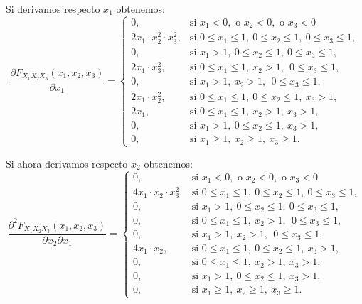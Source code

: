 \documentclass[]{book}
\begin{document}
Si derivamos respecto \(x_1\) obtenemos:
\[
\frac{\partial F_{X_1X_2X_3}(x_1,x_2,x_3)}{\partial x_1}=\begin{cases}
0, & \mbox{si }x_1<0,\mbox{ o }x_2<0,\mbox{ o }x_3 <0\\
2 x_1\cdot x_2^2\cdot x_3^2, & \mbox{si }0\leq x_1\leq 1,\ 0\leq x_2\leq 1,\ 0\leq x_3\leq 1, \\
 0, & \mbox{si }x_1> 1,\ 0\leq x_2\leq  1,\ 0\leq x_3\leq  1, \\
 2 x_1 \cdot x_3^2, & \mbox{si }0\leq x_1\leq  1,\ x_2> 1,\ \ 0\leq x_3\leq  1, \\
 0, & \mbox{si }x_1> 1,\ x_2> 1,\ \ 0\leq x_3\leq  1, \\
 2 x_1\cdot x_2^2, & \mbox{si }0\leq x_1\leq  1,\ 0\leq x_2\leq  1,\ x_3> 1,\\
 2 x_1, & \mbox{si }0\leq x_1\leq  1,\ x_2 >  1,\ x_3> 1,\\
 0, & \mbox{si }x_1>1,\ 0\leq x_2\leq  1,\ x_3> 1,\\
0, & \mbox{si }x_1\geq 1,\ x_2\geq 1,\ x_3\geq 1.
\end{cases}
\]

Si ahora derivamos respecto \(x_2\) obtenemos:
\[
\frac{\partial^2 F_{X_1X_2X_3}(x_1,x_2,x_3)}{\partial x_2\partial x_1}=\begin{cases}
0, & \mbox{si }x_1<0,\mbox{ o }x_2<0,\mbox{ o }x_3 <0\\
4 x_1\cdot x_2\cdot x_3^2, & \mbox{si }0\leq x_1\leq 1,\ 0\leq x_2\leq 1,\ 0\leq x_3\leq 1, \\
 0, & \mbox{si }x_1> 1,\ 0\leq x_2\leq  1,\ 0\leq x_3\leq  1, \\
 0, & \mbox{si }0\leq x_1\leq  1,\ x_2> 1,\ \ 0\leq x_3\leq  1, \\
 0, & \mbox{si }x_1> 1,\ x_2> 1,\ \ 0\leq x_3\leq  1, \\
 4 x_1\cdot x_2, & \mbox{si }0\leq x_1\leq  1,\ 0\leq x_2\leq  1,\ x_3> 1,\\
 0, & \mbox{si }0\leq x_1\leq  1,\ x_2 >  1,\ x_3> 1,\\
 0, & \mbox{si }x_1>1,\ 0\leq x_2\leq  1,\ x_3> 1,\\
0, & \mbox{si }x_1\geq 1,\ x_2\geq 1,\ x_3\geq 1.
\end{cases}
\]
\end{document}
